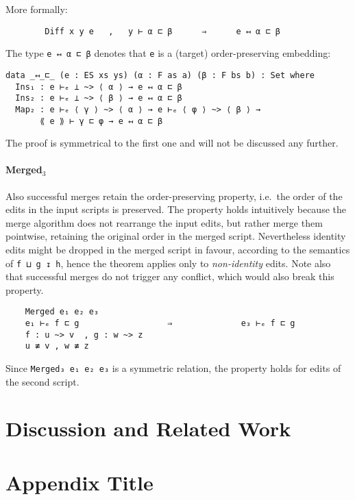 \documentclass[preprint]{sigplanconf}
\begin{document}
    More formally:
\begin{verbatim}
        Diff x y e   ,   y ⊢ α ⊏ β      ⇒      e ↤ α ⊏ β
\end{verbatim}

    The type \texttt{e ↤ α ⊏ β} denotes that \texttt{e} is a (target) 
    order-preserving embedding:

\begin{verbatim}
data _↤_⊏_ (e : ES xs ys) (α : F as a) (β : F bs b) : Set where
  Ins₁ : e ⊢ₑ ⊥ ~> ⟨ α ⟩ → e ↤ α ⊏ β
  Ins₂ : e ⊢ₑ ⊥ ~> ⟨ β ⟩ → e ↤ α ⊏ β
  Map₂ : e ⊢ₑ ⟨ γ ⟩ ~> ⟨ α ⟩ → e ⊢ₑ ⟨ φ ⟩ ~> ⟨ β ⟩ → 
       ⟪ e ⟫ ⊢ γ ⊏ φ → e ↤ α ⊏ β
\end{verbatim}

    The proof is symmetrical to the first one and will not be discussed any further.

    \paragraph{Merged$_3$}
    Also successful merges retain the order-preserving property, i.e.\
    the order of the edits in the input scripts is preserved.
    The property holds intuitively because the merge algorithm
    does not rearrange the input edits, 
    but rather merge them pointwise, retaining the original order in the merged 
    script.
    Nevertheless identity edits might be dropped in the merged script in favour,
    according to the semantics of \texttt{f ⊔ g ↧ h}, hence
    the theorem applies only to \emph{non-identity} edits.
    Note also that successful merges do not trigger any conflict, which
    would also break this property.

\begin{verbatim}
    Merged e₁ e₂ e₃
    e₁ ⊢ₑ f ⊏ g                  ⇒              e₃ ⊢ₑ f ⊏ g
    f : u ~> v  , g : w ~> z  
    u ≢ v , w ≢ z
\end{verbatim}
    Since \texttt{Merged₃ e₁ e₂ e₃} is a symmetric relation, the property holds 
    for edits of the second script. 

\section{Discussion and Related Work}

\appendix
\section{Appendix Title}
\end{document}
